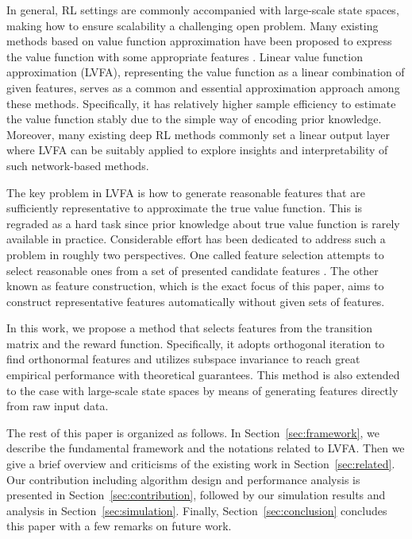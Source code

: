 \documentclass[onecolumn, conference]{IEEEtran}
\begin{document}
	In general, RL settings are commonly accompanied with large-scale state spaces, making how to ensure scalability a challenging open problem. Many existing methods based on value function approximation have been proposed to express the value function with some appropriate features \cite{Sutton2005ReinforcementLA, Szepesvari2010AlgorithmsFR, Wang2020OnRR}. Linear value function approximation (LVFA), representing the value function as a linear combination of given features, serves as a common and essential approximation approach among these methods. Specifically, it has relatively higher sample efficiency to  estimate the value function stably due to the simple way of encoding prior knowledge. Moreover, many existing deep RL methods \cite{Mnih2013PlayingAW, Silver2017MasteringTG, Lillicrap2016ContinuousCW, ShalevShwartz2016SafeMR} commonly set a linear output layer where LVFA can be suitably applied to explore insights and interpretability of such network-based methods. 
		
	The key problem in LVFA is how to generate reasonable features that are sufficiently representative to approximate the true value function. This is regraded as a hard task since prior knowledge about true value function is rarely available in practice. Considerable effort has been dedicated to address such a problem in roughly two perspectives. One called  feature selection attempts to select reasonable ones from a set of presented candidate features \cite{Bradtke2004LinearLA, Sutton2005LearningTP, Geramifard2006IncrementalLT, Kolter2009RegularizationAF, Johns2010LinearCF, Petrik2010FeatureSU}. The other known as feature construction, which is the exact focus of this paper, aims to construct representative features automatically without given sets of features\cite{Parr2008AnAO,Petrik2007AnAO ,Parr2007AnalyzingFG,Song2016LinearFE,Behzadian2019FeatureSB}. 
	
	In this work, we propose a method that selects features from the transition matrix and the reward function. Specifically, it adopts orthogonal iteration to find orthonormal features and utilizes subspace invariance to reach great empirical performance with theoretical guarantees. This method is also extended to the case with large-scale state spaces by means of generating features directly from raw input data.

The rest of this paper is organized as follows. In Section~\ref{sec:framework}, we describe the fundamental framework and the notations related to LVFA. Then we  give a brief overview and criticisms of the existing work in Section~\ref{sec:related}. Our contribution including algorithm design and performance analysis is presented in Section~\ref{sec:contribution}, followed by our simulation results and analysis in Section~\ref{sec:simulation}. Finally, Section~\ref{sec:conclusion} concludes this paper with a few remarks on future work.
\end{document}
